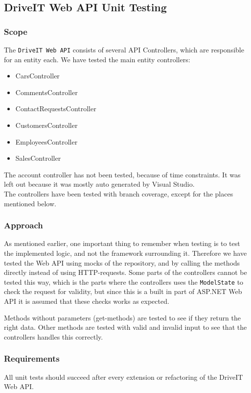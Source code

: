 \subsection{DriveIT Web API Unit Testing}
\subsubsection{Scope}
The \texttt{DriveIT Web API} consists of several API Controllers, which are responsible for an entity each. We have tested the main entity controllers:
\begin{itemize}
	\item CarsController
	\item CommentsController
	\item ContactRequestsController
	\item CustomersController
	\item EmployeesController
	\item SalesController
\end{itemize}
The account controller has not been tested, because of time constraints. It was left out because it was mostly auto generated by Visual Studio.\\

The controllers have been tested with branch coverage, except for the places mentioned below.
\subsubsection{Approach}
As mentioned earlier, one important thing to remember when testing is to test the implemented logic, and not the framework surrounding it. Therefore we have tested the Web API using mocks of the repository, and by calling the methods directly instead of using HTTP-requests.
Some parts of the controllers cannot be tested this way, which is the parts where the controllers uses the \texttt{ModelState} to check the request for validity, but since this is a built in part of ASP.NET Web API it is assumed that these checks works as expected.

Methods without parameters (get-methods) are tested to see if they return the right data. Other methods are tested with valid and invalid input to see that the controllers handles this correctly.

\subsubsection{Requirements}
All unit tests should succeed after every extension or refactoring of the DriveIT Web API.

